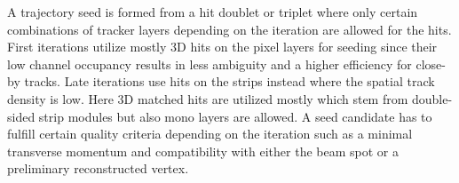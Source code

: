 
A trajectory seed is formed from a hit doublet or triplet where only certain combinations of tracker layers depending on the iteration are allowed for the hits. First iterations utilize mostly 3D hits on the pixel layers for seeding since their low channel occupancy results in less ambiguity and a higher efficiency for close-by tracks. Late iterations use hits on the strips instead where the spatial track density is low. Here 3D matched hits are utilized mostly which stem from double-sided strip modules but also mono layers are allowed. A seed candidate has to fulfill certain quality criteria depending on the iteration such as a minimal transverse momentum and compatibility with either the beam spot or a preliminary reconstructed vertex.

